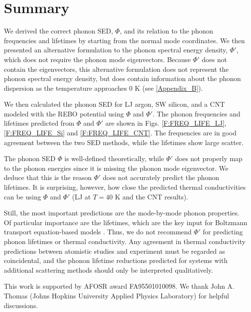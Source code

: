 \documentclass[12pt,twocolumn,iop]{/usr/share/texmf-texlive/tex/latex/iop/iopart}[/usr/share/texmf-texlive/tex/latex/iop/]
\begin{document}
\vspace*{0mm}

\section{\label{Section_Conclusions}Summary}

We derived the correct phonon SED, $\Phi$, and its relation to the phonon frequencies and lifetimes by starting from the normal mode coordinates. We then presented an alternative formulation to the phonon spectral energy density, $\Phi'$, which does not require the phonon mode eigenvectors.  Because $\Phi'$ does not contain the eigenvectors, this alternative formulation does not represent the phonon spectral energy density, but does contain information about the phonon dispersion as the temperature approaches $0$ K (see \ref{Appendix_B}).

We then calculated the phonon SED for LJ argon, SW silicon, and a CNT modeled with the REBO potential using $\Phi$ and $\Phi'$. The phonon frequencies and
lifetimes predicted from $\Phi$ and $\Phi'$ are shown in Figs$.$ \ref{F:FREQ_LIFE_LJ}, \ref{F:FREQ_LIFE_Si} and \ref{F:FREQ_LIFE_CNT}. The
frequencies are in good agreement between the two SED methods, while the lifetimes show large scatter.

The phonon SED $\Phi$ is well-defined theoretically, while $\Phi'$ does not properly map to the phonon energies since it is missing the phonon mode eigenvector. We deduce that this is the reason $\Phi'$ does not accurately predict the phonon lifetimes. It is surprising, however, how close the predicted thermal conductivities can be using $\Phi$ and $\Phi'$ (LJ at $T=40$ K and the CNT results).

Still, the most important predictions are the mode-by-mode phonon properties. Of particular importance are the lifetimes, which are the key input for Boltzmann transport equation-based models \cite{mcgaughey2011a}. Thus, we do not recommend $\Phi'$ for predicting phonon lifetimes or thermal conductivity.  Any agreement in thermal conductivity predictions between atomistic studies\cite{thomas2010c} and experiment\cite{dekoker2009,qiu2011} must be regarded as coincidental, and the phonon lifetime reductions predicted for systems with additional scattering methods \cite{thomas2010c,shiomi2011a} should only be interpreted qualitatively.

\ack
This work is supported by AFOSR award FA95501010098. We thank John A. Thomas (Johns Hopkins University Applied Physics Laboratory) for helpful discussions.
\end{document}
